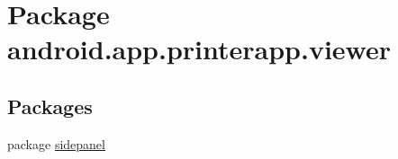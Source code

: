 \hypertarget{namespaceandroid_1_1app_1_1printerapp_1_1viewer}{}\section{Package android.\+app.\+printerapp.\+viewer}
\label{namespaceandroid_1_1app_1_1printerapp_1_1viewer}
\subsection*{Packages}
\begin{DoxyCompactItemize}
\item 
package \hyperlink{namespaceandroid_1_1app_1_1printerapp_1_1viewer_1_1sidepanel}{sidepanel}
\end{DoxyCompactItemize}
